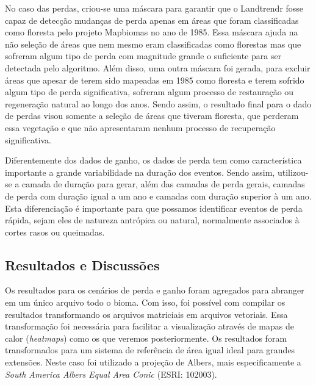 No caso das perdas, criou-se uma máscara para garantir que o Landtrendr fosse capaz de detecção mudanças de perda apenas em áreas que foram classificadas como floresta pelo projeto Mapbiomas no ano de 1985. Essa máscara ajuda na não seleção de áreas que nem mesmo eram classificadas como florestas mas que sofreram algum tipo de perda com magnitude grande o suficiente para ser detectada pelo algoritmo. Além disso, uma outra máscara foi gerada, para excluir áreas que apesar de terem sido mapeadas em 1985 como floresta e terem sofrido algum tipo de perda significativa, sofreram algum processo de restauração ou regeneração natural ao longo dos anos. Sendo assim, o resultado final para o dado de perdas visou somente a seleção de áreas que tiveram floresta, que perderam essa vegetação e que não apresentaram nenhum processo de recuperação significativa.

Diferentemente dos dados de ganho, os dados de perda tem como característica importante a grande variabilidade na duração dos eventos. Sendo assim, utilizou-se a camada de duração para gerar, além das camadas de perda gerais, camadas de perda com duração igual a um ano e camadas com duração superior à um ano. Esta diferenciação é importante para que possamos identificar eventos de perda rápida, sejam eles de natureza antrópica ou natural, normalmente associados à cortes rasos ou queimadas. 


\subsection{Resultados e Discussões}

\hspace{13pt} Os resultados para os cenários de perda e ganho foram agregados para abranger em um único arquivo todo o bioma. Com isso, foi possível com compilar os resultados transformando os arquivos matriciais em arquivos vetoriais. Essa transformação foi necessária para facilitar a visualização através de mapas de calor (\textit{heatmaps}) como os que veremos posteriormente. Os resultados foram transformados para um sistema de referência de área igual ideal para grandes extensões. Neste caso foi utilizado a projeção de Albers, mais especificamente a \textit{South America Albers Equal Area Conic} (ESRI: 102003). 

